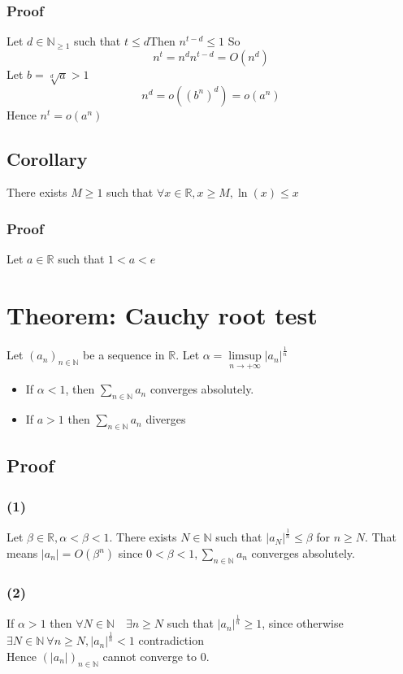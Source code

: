 \documentclass{book}
\begin{document}
\subsubsection{Proof}
Let $d\in\mathbb{N} _{\geq1}$ such that $t\leq d$Then $n^{t-d}\leq 1$
So
$$n^t=n^dn^{t-d}=O(n^d)$$
Let $b=\sqrt[d]{a}>1$$$n^d=o((b^n)^d)=o(a^n)$$
\indent Hence $n^t=o(a^n)$
\subsection{Corollary}
There exists $M\geq1$ such that $\forall x\in \mathbb{R} ,x\geq M,\ln(x)\leq x$
\subsubsection{Proof}
Let $a\in\mathbb{R} $ such that $1<a<e$
\section{Theorem: Cauchy root test}
Let $(a_n)_{n\in\mathbb{N} }$ be a sequence in $\mathbb{R} $. Let $\alpha=\limsup\limits_{n\rightarrow+\infty}\lvert a_n\rvert^{\frac{1}{n}}$\begin{itemize}
    \item If $\alpha<1$, then $\sum\limits_{n\in \mathbb{N} }a_n$ converges absolutely.
    \item If $a>1$ then $\sum\limits_{n\in \mathbb{N} }a_n$ diverges
\end{itemize}
\subsection{Proof}
\subsubsection{(1)}
Let $\beta\in \mathbb{R} ,\alpha<\beta<1$. There exists $N\in \mathbb{N} $ such that $\lvert a_N \rvert^{\frac{1}{n}}\leq\beta$ for $n\geq N$. That means  $\lvert a_n\rvert=O(\beta ^n)$ since $0<\beta<1,\sum\limits_{n\in \mathbb{N} }a_n$ converges absolutely.
\subsubsection{(2)}
If $\alpha>1$ then $\forall N\in \mathbb{N} \quad \exists n \geq N$ such that $\lvert a_n\rvert ^{\frac{1}{n}}\geq1$, since otherwise $\exists N\in \mathbb{N} \ \forall n\geq N,\lvert a_n\rvert^\frac{1}{n}<1$ contradiction\\
Hence $(\lvert a_n\rvert)_{n\in \mathbb{N} }$ cannot converge to 0.
\end{document}

